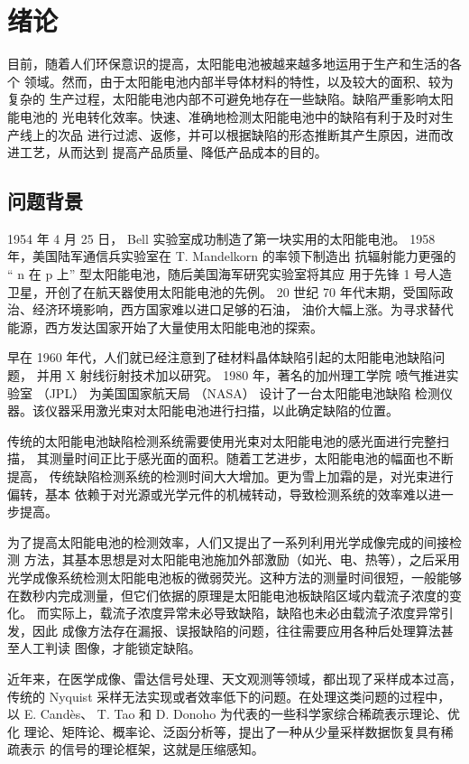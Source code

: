 \chapter{绪论}

目前，随着人们环保意识的提高，太阳能电池被越来越多地运用于生产和生活的各个
领域。然而，由于太阳能电池内部半导体材料的特性，以及较大的面积、较为复杂的
生产过程，太阳能电池内部不可避免地存在一些缺陷。缺陷严重影响太阳能电池的
光电转化效率。快速、准确地检测太阳能电池中的缺陷有利于及时对生产线上的次品
进行过滤、返修，并可以根据缺陷的形态推断其产生原因，进而改进工艺，从而达到
提高产品质量、降低产品成本的目的。

\section{问题背景}

1954 年 4 月 25 日， Bell 实验室成功制造了第一块实用的太阳能电池。
\cite{First} 1958 年，美国陆军通信兵实验室在 T. Mandelkorn 的率领下制造出
抗辐射能力更强的 “ n 在 p 上” 型太阳能电池，随后美国海军研究实验室将其应
用于先锋 1 号人造卫星，开创了在航天器使用太阳能电池的先例。\cite{Vanguard}
20 世纪 70 年代末期，受国际政治、经济环境影响，西方国家难以进口足够的石油，
油价大幅上涨。为寻求替代能源，西方发达国家开始了大量使用太阳能电池的探索。

早在 1960 年代，人们就已经注意到了硅材料晶体缺陷引起的太阳能电池缺陷问题，
并用 X 射线衍射技术加以研究。\cite{SiliconXray} 1980 年，著名的加州理工学院
喷气推进实验室 （JPL） 为美国国家航天局 （NASA） 设计了一台太阳能电池缺陷
检测仪器。该仪器采用激光束对太阳能电池进行扫描，以此确定缺陷的位置。
\cite{JPLDefectAnalyzer}

传统的太阳能电池缺陷检测系统需要使用光束对太阳能电池的感光面进行完整扫描，
其测量时间正比于感光面的面积。随着工艺进步，太阳能电池的幅面也不断提高，
传统缺陷检测系统的检测时间大大增加。更为雪上加霜的是，对光束进行偏转，基本
依赖于对光源或光学元件的机械转动，导致检测系统的效率难以进一步提高。

为了提高太阳能电池的检测效率，人们又提出了一系列利用光学成像完成的间接检测
方法，其基本思想是对太阳能电池施加外部激励（如光、电、热等），之后采用
光学成像系统检测太阳能电池板的微弱荧光。这种方法的测量时间很短，一般能够
在数秒内完成测量，但它们依据的原理是太阳能电池板缺陷区域内载流子浓度的变化。
而实际上，载流子浓度异常未必导致缺陷，缺陷也未必由载流子浓度异常引发，因此
成像方法存在漏报、误报缺陷的问题，往往需要应用各种后处理算法甚至人工判读
图像，才能锁定缺陷。

近年来，在医学成像、雷达信号处理、天文观测等领域，都出现了采样成本过高，
传统的 Nyquist 采样无法实现或者效率低下的问题。在处理这类问题的过程中，以
E. Cand\`es、 T. Tao 和 D. Donoho 为代表的一些科学家综合稀疏表示理论、优化
理论、矩阵论、概率论、泛函分析等，提出了一种从少量采样数据恢复具有稀疏表示
的信号的理论框架，这就是压缩感知。

